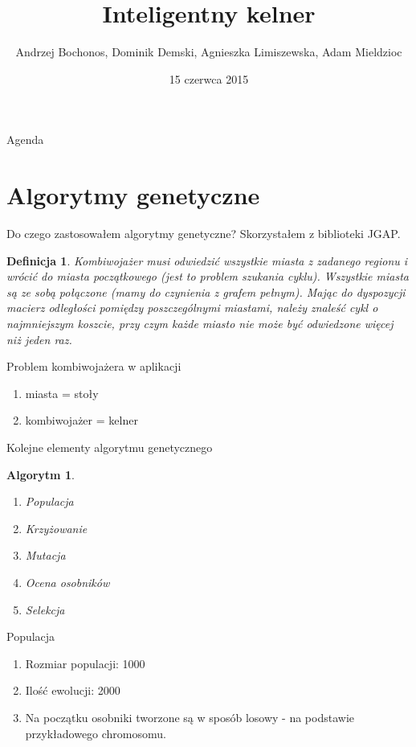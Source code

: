 \documentclass[a4paper,10pt]{beamer}
\date{15 czerwca 2015}
\title{Inteligentny kelner}
\author[A. Bochonos, D. Demski, A. Limiszewska, A. Mieldzioc]{Andrzej Bochonos, Dominik Demski, Agnieszka Limiszewska, Adam Mieldzioc}
\newtheorem{defi}{Definicja}[subsection]
\newtheorem{alg}{Algorytm}[subsection]
\begin{document}
		\begin{frame}
			\titlepage
		\end{frame}
		\begin{frame}{Agenda}
			\tableofcontents
		\end{frame}
		
		\section{Algorytmy genetyczne}
		\begin{frame}{Do czego zastosowałem algorytmy genetyczne?}
			Skorzystałem z biblioteki JGAP.
			\begin{defi}
				Kombiwojażer musi odwiedzić wszystkie miasta z zadanego regionu i wrócić do miasta początkowego (jest to problem szukania cyklu). Wszystkie miasta są ze sobą połączone (mamy do czynienia z grafem pełnym). Mając do dyspozycji macierz odległości pomiędzy poszczególnymi miastami, należy znaleść cykl o najmniejszym koszcie, przy czym każde miasto nie może być odwiedzone więcej niż jeden raz.
			\end{defi}
			
		\end{frame}
		\begin{frame}{Problem kombiwojażera w aplikacji}
			\begin{enumerate}
				\item miasta = stoły
				\item kombiwojażer = kelner
			\end{enumerate}
		\end{frame}
		\begin{frame}{Kolejne elementy algorytmu genetycznego}
			\begin{alg}
				\begin{enumerate}
					\item Populacja
					\item Krzyżowanie
					\item Mutacja
					\item Ocena osobników
					\item Selekcja
				\end{enumerate}
			\end{alg}
		\end{frame}
		\begin{frame}{Populacja}
			\begin{enumerate}
				\item Rozmiar populacji: 1000
				\item Ilość ewolucji: 2000
				\item Na początku osobniki tworzone są w sposób losowy - na podstawie przykładowego chromosomu.
			\end{enumerate}
		\end{frame}
\end{document}

